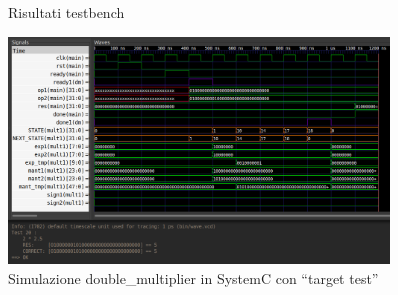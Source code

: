 \documentclass[]{IEEEtran}
\begin{document}
\begin{figure}
    \centering
    \caption{Risultati testbench}
    \label{fig:SIM_TB_RES}
\end{figure}

\begin{figure}[bt]
    \centering
    \includegraphics[width=0.9\textwidth]{figures/sc_target}
    \caption{Simulazione double\_multiplier in SystemC con ``target test''}
    \label{fig:SIM_SC_TARGET}
\end{figure}
\end{document}
